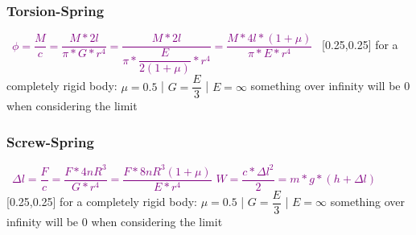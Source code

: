 \documentclass[main.tex,fontsize=8pt,paper=a4,paper=portrait,DIV=calc,]{scrartcl}
\begin{document}
\begin{multicols*}{2}
\subsubsection{Torsion-Spring}
\, \newline
\large \textcolor{purple}{\( \phi = \dfrac{M}{c} = \dfrac{M * 2l}{\pi * G * r^4} = \dfrac{M * 2l}{\pi * \dfrac{E}{2 (1 + \mu)} * r^4} = \dfrac{M * 4l * (1 + \mu)}{\pi * E * r^4}\)}\newline
\, \newline
\normalsize 
{}[0.25,0.25]\newline
for a completely rigid body: \(\mu = 0.5\) | \(G = \dfrac{E}{3}\) | \(E = \infty\)\newline
something over infinity will be 0 when considering the limit

\subsubsection{Screw-Spring}
\, \newline
\large \textcolor{purple}{\( \Delta l = \dfrac{F}{c} = \dfrac{F * 4nR^3}{G * r^4} = \dfrac{F * 8nR^3 (1 + \mu)}{E * r^4}\)}\newline
\large \textcolor{purple}{\( W = \dfrac{c * \Delta l^2}{2} = m * g * (h + \Delta l) \)}\newline
\, \newline
\normalsize 
{}[0.25,0.25]\newline
for a completely rigid body: \(\mu = 0.5\) | \(G = \dfrac{E}{3}\) | \(E = \infty\)\newline
something over infinity will be 0 when considering the limit


\end{multicols*}
\end{document}
